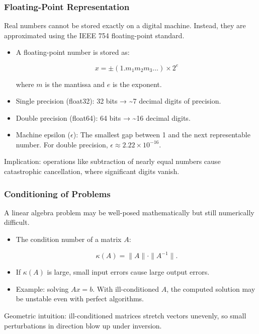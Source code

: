 \documentclass[
  letterpaper,
  DIV=11,
  numbers=noendperiod]{scrreprt}
\begin{document}
\subsubsection{Floating-Point
Representation}\label{floating-point-representation}

Real numbers cannot be stored exactly on a digital machine. Instead,
they are approximated using the IEEE 754 floating-point standard.

\begin{itemize}
\item
  A floating-point number is stored as:

  \[
  x = \pm (1.m_1 m_2 m_3 \dots) \times 2^e
  \]

  where \(m\) is the mantissa and \(e\) is the exponent.
\item
  Single precision (float32): 32 bits → \textasciitilde7 decimal digits
  of precision.
\item
  Double precision (float64): 64 bits → \textasciitilde16 decimal
  digits.
\item
  Machine epsilon (\(\epsilon\)): The smallest gap between 1 and the
  next representable number. For double precision,
  \(\epsilon \approx 2.22 \times 10^{-16}\).
\end{itemize}

Implication: operations like subtraction of nearly equal numbers cause
catastrophic cancellation, where significant digits vanish.

\subsubsection{Conditioning of Problems}\label{conditioning-of-problems}

A linear algebra problem may be well-posed mathematically but still
numerically difficult.

\begin{itemize}
\item
  The condition number of a matrix \(A\):

  \[
  \kappa(A) = \|A\| \cdot \|A^{-1}\|.
  \]
\item
  If \(\kappa(A)\) is large, small input errors cause large output
  errors.
\item
  Example: solving \(Ax = b\). With ill-conditioned \(A\), the computed
  solution may be unstable even with perfect algorithms.
\end{itemize}

Geometric intuition: ill-conditioned matrices stretch vectors unevenly,
so small perturbations in direction blow up under inversion.
\end{document}
